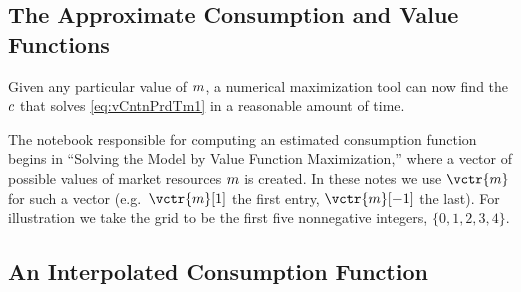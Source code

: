 \hypertarget{the-approximate-consumption-and-value-functions}{}
\subsection{The Approximate Consumption and Value Functions}

Given any particular value of $m$, a numerical maximization tool can now find the $c$ that solves \eqref{eq:vCntnPrdTm1} in a reasonable amount of time.

The notebook responsible for computing an estimated consumption function begins in ``Solving the Model by Value Function Maximization,'' where a vector of possible values of market resources $m$ is created.  In these notes we use $\vctr{m}$ for such a vector (e.g.\ $\vctr{m}[1]$ the first entry, $\vctr{m}[-1]$ the last).  For illustration we take the grid to be the first five nonnegative integers, $\{0,1,2,3,4\}$.



\hypertarget{an-interpolated-consumption-function}{}
\subsection{An Interpolated Consumption Function} \label{subsec:LinInterp}



